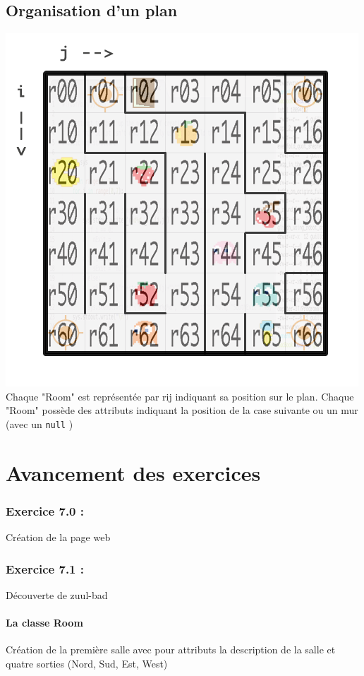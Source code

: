 \documentclass[twoside,french]{report}
\begin{document}
\section{Organisation d'un plan}
   \includegraphics[scale=0.4]{graphics/Plan-Projet-1_numbered.png} \\
   Chaque "Room" est représentée par rij indiquant sa position sur le plan.
   Chaque "Room" possède des attributs indiquant la position de la case suivante ou un mur (avec un \lstinline|null| )



\chapter{Avancement des exercices}
\subsection*{Exercice 7.0 : }
Création de la page web

\subsection*{Exercice 7.1 : }
Découverte de zuul-bad

\subsubsection*{La classe Room}
Création de la première salle avec pour attributs la description de la salle et quatre sorties (Nord, Sud, Est, West)
\end{document}
